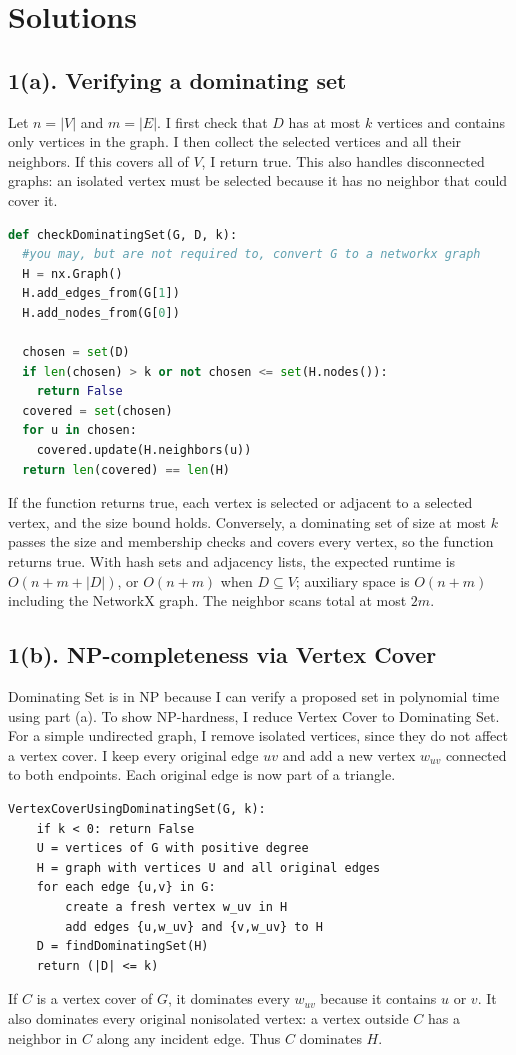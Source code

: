 
\clearpage
\section*{Solutions}
\small
\subsection*{1(a). Verifying a dominating set}
Let $n=|V|$ and $m=|E|$. I first check that $D$ has at most $k$ vertices and contains only vertices in the graph. I then collect the selected vertices and all their neighbors. If this covers all of $V$, I return true. This also handles disconnected graphs: an isolated vertex must be selected because it has no neighbor that could cover it.
\begin{lstlisting}[language=Python]
def checkDominatingSet(G, D, k):
  #you may, but are not required to, convert G to a networkx graph
  H = nx.Graph()
  H.add_edges_from(G[1])
  H.add_nodes_from(G[0])

  chosen = set(D)
  if len(chosen) > k or not chosen <= set(H.nodes()):
    return False
  covered = set(chosen)
  for u in chosen:
    covered.update(H.neighbors(u))
  return len(covered) == len(H)
\end{lstlisting}

If the function returns true, each vertex is selected or adjacent to a selected vertex, and the size bound holds. Conversely, a dominating set of size at most $k$ passes the size and membership checks and covers every vertex, so the function returns true. With hash sets and adjacency lists, the expected runtime is $O(n+m+|D|)$, or $O(n+m)$ when $D\subseteq V$; auxiliary space is $O(n+m)$ including the NetworkX graph. The neighbor scans total at most $2m$.

\subsection*{1(b). NP-completeness via Vertex Cover}
Dominating Set is in NP because I can verify a proposed set in polynomial time using part (a). To show NP-hardness, I reduce Vertex Cover to Dominating Set. For a simple undirected graph, I remove isolated vertices, since they do not affect a vertex cover. I keep every original edge $uv$ and add a new vertex $w_{uv}$ connected to both endpoints. Each original edge is now part of a triangle.
\begin{lstlisting}
VertexCoverUsingDominatingSet(G, k):
    if k < 0: return False
    U = vertices of G with positive degree
    H = graph with vertices U and all original edges
    for each edge {u,v} in G:
        create a fresh vertex w_uv in H
        add edges {u,w_uv} and {v,w_uv} to H
    D = findDominatingSet(H)
    return (|D| <= k)
\end{lstlisting}
If $C$ is a vertex cover of $G$, it dominates every $w_{uv}$ because it contains $u$ or $v$. It also dominates every original nonisolated vertex: a vertex outside $C$ has a neighbor in $C$ along any incident edge. Thus $C$ dominates $H$.

